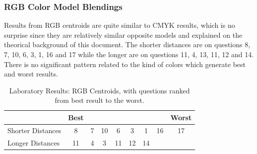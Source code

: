 \subsubsection{RGB Color Model Blendings}
\label{subsubsec:rgbcolormodel}
%
Results from RGB centroids are quite similar to CMYK results, which is no surprise since they are relatively similar opposite models and explained on the theorical background of this document.
The shorter distances are on questions 8, 7, 10, 6, 3, 1, 16 and 17 while the longer are on questions 11, 4, 13, 11, 12 and 14. There is no significant pattern related to the kind of colors which generate best and worst results.
%
\begin{table}[htbp]
  \centering
  \begin{tabular}{@{}lcccccccc@{}}
  \toprule
      & \multicolumn{1}{l}{Best}                        & \multicolumn{1}{l}{}                            & \multicolumn{1}{l}{}                           & \multicolumn{1}{l}{}                            & \multicolumn{1}{l}{}                            & \multicolumn{1}{l}{}                            & \multicolumn{1}{l}{}                            & \multicolumn{1}{l}{Worst}                       \\ \midrule
  \multicolumn{1}{l|}{Shorter Distances} & \multicolumn{1}{c||}{\cellcolor[HTML]{FF0000}8} & \multicolumn{1}{c||}{\cellcolor[HTML]{0000FF}7}  & \multicolumn{1}{c||}{\cellcolor[HTML]{0080FF}10} & \multicolumn{1}{c||}{\cellcolor[HTML]{FF8000}6}  & \multicolumn{1}{c||}{\cellcolor[HTML]{80FF00}3} & \multicolumn{1}{c||}{\cellcolor[HTML]{FFFF00}1} & \multicolumn{1}{c||}{\cellcolor[HTML]{FF007F}16} & \multicolumn{1}{c|}{\cellcolor[HTML]{00FF00}17} \\ \midrule
  \multicolumn{1}{l|}{Longer Distances}  & \multicolumn{1}{c||}{\cellcolor[HTML]{FF8000}11} & \multicolumn{1}{c||}{\cellcolor[HTML]{7F00FF}4} & \multicolumn{1}{c||}{\cellcolor[HTML]{80FF00}3} & \multicolumn{1}{c||}{\cellcolor[HTML]{FF8000}11} & \multicolumn{1}{c||}{\cellcolor[HTML]{80FF00}12} & \multicolumn{1}{c||}{\cellcolor[HTML]{8000FF}14} & & \\ \bottomrule
  \end{tabular}
  \caption[Laboratory Results: RGB Centroids]{Laboratory Results: RGB Centroids, with questions ranked from best result to the worst.}
  \label{table:centroids_rgbresults}
\end{table}
%
